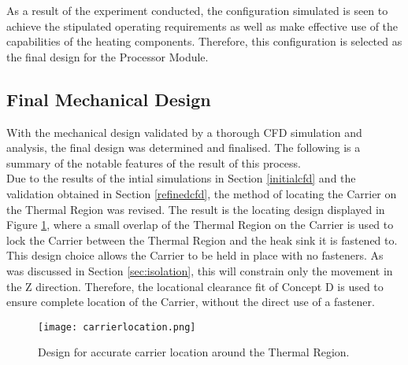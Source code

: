 As a result of the experiment conducted, the configuration simulated is seen to achieve the stipulated operating requirements as well as make effective use of the capabilities of the heating components. Therefore, this configuration is selected as the final design for the Processor Module.

\subsection{Final Mechanical Design}
\label{sec:mechdesign}

With the mechanical design validated by a thorough CFD simulation and analysis, the final design was determined and finalised. The following is a summary of the notable features of the result of this process.\\

Due to the results of the intial simulations in Section \ref{initialcfd} and the validation obtained in Section \ref{refinedcfd}, the method of locating the Carrier on the Thermal Region was revised. The result is the locating design displayed in Figure \ref{fig:carrierlocation}, where a small overlap of the Thermal Region on the Carrier is used to lock the Carrier between the Thermal Region and the heak sink it is fastened to. This design choice allows the Carrier to be held in place with no fasteners. As was discussed in Section \ref{sec:isolation}, this will constrain only the movement in the Z direction. Therefore, the locational clearance fit of Concept D is used to ensure complete location of the Carrier, without the direct use of a fastener.

\begin{figure}[!htb]
	\centering
	\texttt{[image: carrierlocation.png]}
	\caption[Design for Carrier Location on Thermal Region.]{Design for accurate carrier location around the Thermal Region.}
	\label{fig:carrierlocation}
\end{figure} 
\FloatBarrier

